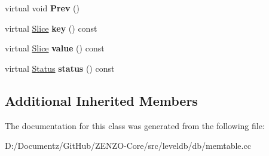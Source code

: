 \begin{DoxyCompactItemize}
virtual void {\bfseries Prev} ()
\item 
\mbox{\label{classleveldb_1_1_mem_table_iterator_a6044613338dfb547fc5148e4b6461d15}} 
virtual \mbox{\hyperlink{classleveldb_1_1_slice}{Slice}} {\bfseries key} () const
\item 
\mbox{\label{classleveldb_1_1_mem_table_iterator_a6c2907c8c87d2b2933adcd5f0e01f781}} 
virtual \mbox{\hyperlink{classleveldb_1_1_slice}{Slice}} {\bfseries value} () const
\item 
\mbox{\label{classleveldb_1_1_mem_table_iterator_af9bc5f041cd319cfb44408d6bf5aa4a2}} 
virtual \mbox{\hyperlink{classleveldb_1_1_status}{Status}} {\bfseries status} () const
\end{DoxyCompactItemize}
\subsection*{Additional Inherited Members}


The documentation for this class was generated from the following file\+:\begin{DoxyCompactItemize}
\item 
D\+:/\+Documentz/\+Git\+Hub/\+Z\+E\+N\+Z\+O-\/\+Core/src/leveldb/db/memtable.\+cc\end{DoxyCompactItemize}
